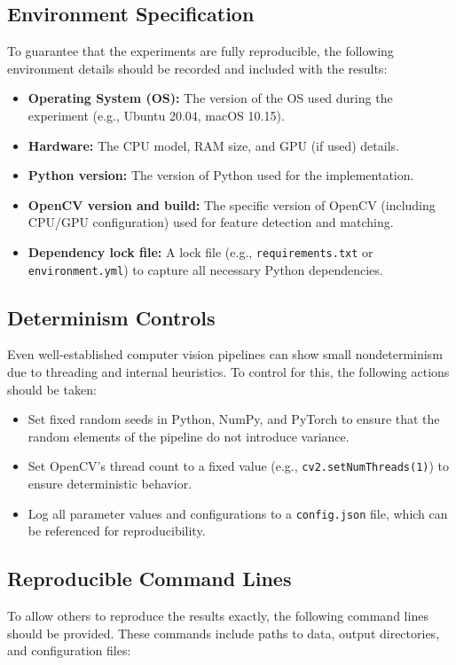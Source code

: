 
\subsection{Environment Specification}
To guarantee that the experiments are fully reproducible, the following environment details should be recorded and included with the results:
\begin{itemize}
  \item \textbf{Operating System (OS):} The version of the OS used during the experiment (e.g., Ubuntu 20.04, macOS 10.15).
  \item \textbf{Hardware:} The CPU model, RAM size, and GPU (if used) details.
  \item \textbf{Python version:} The version of Python used for the implementation.
  \item \textbf{OpenCV version and build:} The specific version of OpenCV (including CPU/GPU configuration) used for feature detection and matching.
  \item \textbf{Dependency lock file:} A lock file (e.g., \texttt{requirements.txt} or \texttt{environment.yml}) to capture all necessary Python dependencies.
\end{itemize}

\subsection{Determinism Controls}
Even well-established computer vision pipelines can show small nondeterminism due to threading and internal heuristics. To control for this, the following actions should be taken:
\begin{itemize}
  \item Set fixed random seeds in Python, NumPy, and PyTorch to ensure that the random elements of the pipeline do not introduce variance.
  \item Set OpenCV's thread count to a fixed value (e.g., \texttt{cv2.setNumThreads(1)}) to ensure deterministic behavior.
  \item Log all parameter values and configurations to a \texttt{config.json} file, which can be referenced for reproducibility.
\end{itemize}

\subsection{Reproducible Command Lines}
To allow others to reproduce the results exactly, the following command lines should be provided. These commands include paths to data, output directories, and configuration files:

